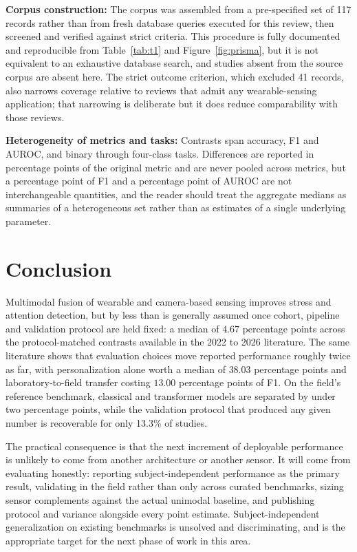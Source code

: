 \documentclass[11pt,a4paper]{article}
\begin{document}
\textbf{Corpus construction:} The corpus was assembled from a pre-specified set of 117 records
rather than from fresh database queries executed for this review, then screened and verified
against strict criteria. This procedure is fully documented and reproducible from
Table~\ref{tab:t1} and Figure~\ref{fig:prisma}, but it is not equivalent to an exhaustive
database search, and studies absent from the source corpus are absent here. The strict
outcome criterion, which excluded 41 records, also narrows coverage relative to reviews that
admit any wearable-sensing application; that narrowing is deliberate but it does reduce
comparability with those reviews.

\textbf{Heterogeneity of metrics and tasks:} Contrasts span accuracy, F1 and AUROC, and
binary through four-class tasks. Differences are reported in percentage points of the
original metric and are never pooled across metrics, but a percentage point of F1 and a
percentage point of AUROC are not interchangeable quantities, and the reader should treat
the aggregate medians as summaries of a heterogeneous set rather than as estimates of a
single underlying parameter.

\section{Conclusion}
Multimodal fusion of wearable and camera-based sensing improves stress and attention
detection, but by less than is generally assumed once cohort, pipeline and validation
protocol are held fixed: a median of $4.67$ percentage points across the protocol-matched
contrasts available in the 2022 to 2026 literature. The same literature shows that evaluation
choices move reported performance roughly twice as far, with personalization alone worth a
median of $38.03$ percentage points and laboratory-to-field transfer costing $13.00$
percentage points of F1. On the field's reference benchmark, classical and transformer models
are separated by under two percentage points, while the validation protocol that produced any
given number is recoverable for only 13.3\% of studies.

The practical consequence is that the next increment of deployable performance is unlikely to
come from another architecture or another sensor. It will come from evaluating honestly:
reporting subject-independent performance as the primary result, validating in the field
rather than only across curated benchmarks, sizing sensor complements against the actual
unimodal baseline, and publishing protocol and variance alongside every point estimate.
Subject-independent generalization on existing benchmarks is unsolved and discriminating, and
is the appropriate target for the next phase of work in this area.
\end{document}
